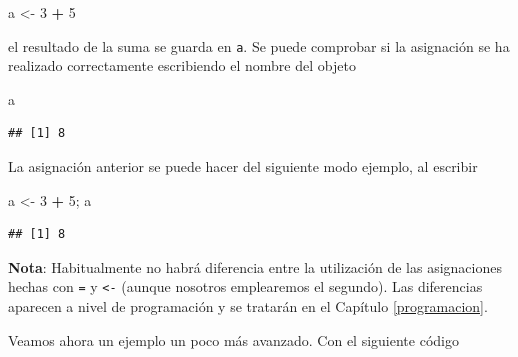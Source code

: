 \documentclass[]{book}
\newenvironment{Shaded}{\begin{snugshade}}{\end{snugshade}}
\newcommand{\DecValTok}[1]{\textcolor[rgb]{0.00,0.00,0.81}{#1}}
\newcommand{\StringTok}[1]{\textcolor[rgb]{0.31,0.60,0.02}{#1}}
\newcommand{\OperatorTok}[1]{\textcolor[rgb]{0.81,0.36,0.00}{\textbf{#1}}}
\newcommand{\NormalTok}[1]{#1}
\begin{document}
\begin{Shaded}
\begin{Highlighting}[]
\NormalTok{a <-}\StringTok{ }\DecValTok{3} \OperatorTok{+}\StringTok{ }\DecValTok{5}
\end{Highlighting}
\end{Shaded}

el resultado de la suma se guarda en \texttt{a}. Se puede comprobar si
la asignación se ha realizado correctamente escribiendo el nombre del
objeto

\begin{Shaded}
\begin{Highlighting}[]
\NormalTok{a}
\end{Highlighting}
\end{Shaded}

\begin{verbatim}
## [1] 8
\end{verbatim}

La asignación anterior se puede hacer del siguiente modo ejemplo, al
escribir

\begin{Shaded}
\begin{Highlighting}[]
\NormalTok{a <-}\StringTok{ }\DecValTok{3} \OperatorTok{+}\StringTok{ }\DecValTok{5}\NormalTok{; a}
\end{Highlighting}
\end{Shaded}

\begin{verbatim}
## [1] 8
\end{verbatim}

\textbf{Nota}: Habitualmente no habrá diferencia entre la utilización de
las asignaciones hechas con \texttt{=} y \texttt{\textless{}-} (aunque
nosotros emplearemos el segundo). Las diferencias aparecen a nivel de
programación y se tratarán en el Capítulo \ref{programacion}.

Veamos ahora un ejemplo un poco más avanzado. Con el siguiente código
\end{document}
